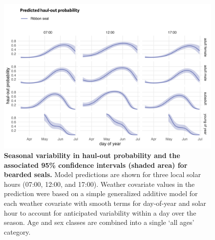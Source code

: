 \documentclass[fleqn,10pt,lineno]{wlpeerj} %
\begin{document}
\begin{figure}
\includegraphics[width=1\linewidth]{../figures/Figure-013} \caption{\textbf{Seasonal variability in haul-out probability and the associated 95\% confidence intervals (shaded area) for bearded seals.} \linebreak Model predictions are shown for three local solar hours (07:00, 12:00, and 17:00). Weather covariate values in the prediction were based on a simple generalized additive model for each weather covariate with smooth terms for day-of-year and solar hour to account for anticipated variability within a day over the season. Age and sex classes are combined into a single `all ages' category.}\label{fig:beardedPredSE}
\end{figure}
\end{document}
